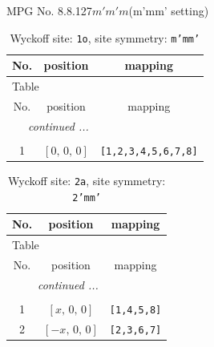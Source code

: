 \documentclass[fleqn,8pt]{jsarticle}
\begin{document}
\setcounter{MaxMatrixCols}{32}

\renewcommand{\tablename}{Table~}
\renewcommand{\figurename}{Figure~}
\begin{center}
\LARGE
MPG No. 8.8.127\quad$m'm'm$\quad(m'mm' setting)
\end{center}
\renewcommand{\arraystretch}{1.2}
\begin{longtable}{ccc}
\caption{Wyckoff site: {\tt 1o}, site symmetry: {\tt m'mm'}}
 \\
 \hline \hline
No. & position & mapping \\ \hline \endfirsthead

\multicolumn{2}{l}{\tablename\ \thetable{}} \\
 \hline \hline
No. & position & mapping \\ \hline \endhead

 \hline \hline
\multicolumn{2}{r}{\footnotesize\it continued ...} \\ \endfoot

 \hline \hline
\multicolumn{2}{r}{} \\ \endlastfoot

1 & $\left[ 0,\, 0,\, 0 \right]$ & {\tt [1,2,3,4,5,6,7,8]} \\
\end{longtable}
\renewcommand{\arraystretch}{1.2}
\begin{longtable}{ccc}
\caption{Wyckoff site: {\tt 2a}, site symmetry: {\tt 2'mm'}}
 \\
 \hline \hline
No. & position & mapping \\ \hline \endfirsthead

\multicolumn{2}{l}{\tablename\ \thetable{}} \\
 \hline \hline
No. & position & mapping \\ \hline \endhead

 \hline \hline
\multicolumn{2}{r}{\footnotesize\it continued ...} \\ \endfoot

 \hline \hline
\multicolumn{2}{r}{} \\ \endlastfoot

1 & $\left[ x,\, 0,\, 0 \right]$ & {\tt [1,4,5,8]} \\ \hline
2 & $\left[ - x,\, 0,\, 0 \right]$ & {\tt [2,3,6,7]} \\
\end{longtable}
\renewcommand{\arraystretch}{1.2}
\end{document}
